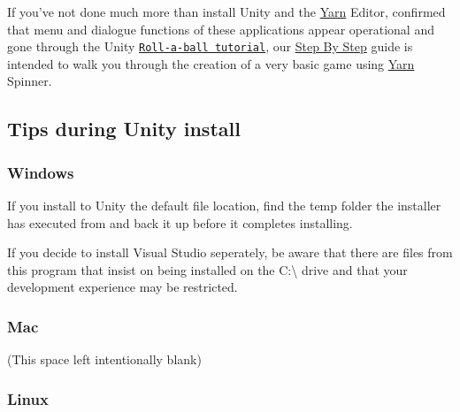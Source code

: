 If you've not done much more than install Unity and the \hyperlink{a00040}{Yarn} Editor, confirmed that menu and dialogue functions of these applications appear operational and gone through the Unity \href{https://unity3d.com/learn/tutorials/projects/roll-ball-tutorial}{\tt Roll-\/a-\/ball tutorial}, our \hyperlink{a00122}{Step By Step} guide is intended to walk you through the creation of a very basic game using \hyperlink{a00040}{Yarn} Spinner.

\subsection*{Tips during Unity install}

\subsubsection*{Windows}


\begin{DoxyItemize}
\item If you install to Unity the default file location, find the temp folder the installer has executed from and back it up before it completes installing.
\item If you decide to install Visual Studio seperately, be aware that there are files from this program that insist on being installed on the C\-:\textbackslash{} drive and that your development experience may be restricted.
\end{DoxyItemize}

\subsubsection*{Mac}

(This space left intentionally blank)

\subsubsection*{Linux}


